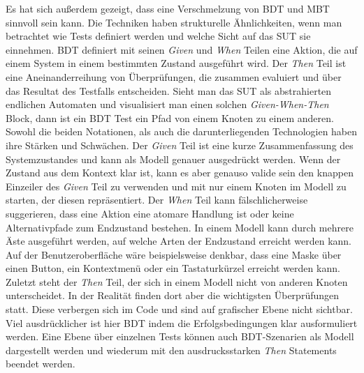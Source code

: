 Es hat sich außerdem gezeigt, dass eine Verschmelzung von \Gls{BDT} und \Gls{MBT} sinnvoll sein kann. Die Techniken haben strukturelle Ähnlichkeiten, wenn man betrachtet wie Tests definiert werden und welche Sicht auf das \Gls{SUT} sie einnehmen. \Gls{BDT} definiert mit seinen \textit{Given} und \textit{When} Teilen eine Aktion, die auf einem System in einem bestimmten Zustand ausgeführt wird. Der \textit{Then} Teil ist eine Aneinanderreihung von Überprüfungen, die zusammen evaluiert und über das Resultat des Testfalls entscheiden. Sieht man das \Gls{SUT} als abstrahierten endlichen Automaten und visualisiert man einen solchen \textit{Given-When-Then} Block, dann ist ein \Gls{BDT} Test ein Pfad von einem Knoten zu einem anderen. Sowohl die beiden Notationen, als auch die darunterliegenden Technologien haben ihre Stärken und Schwächen. Der \textit{Given} Teil ist eine kurze Zusammenfassung des Systemzustandes und kann als Modell genauer ausgedrückt werden. Wenn der Zustand aus dem Kontext klar ist, kann es aber genauso valide sein den knappen Einzeiler des \textit{Given} Teil zu verwenden und mit nur einem Knoten im Modell zu starten, der diesen repräsentiert. Der \textit{When} Teil kann fälschlicherweise suggerieren, dass eine Aktion eine atomare Handlung ist oder keine Alternativpfade zum Endzustand bestehen. In einem Modell kann durch mehrere Äste ausgeführt werden, auf welche Arten der Endzustand erreicht werden kann. Auf der Benutzeroberfläche wäre beispielsweise denkbar, dass eine Maske über einen Button, ein Kontextmenü oder ein Tastaturkürzel erreicht werden kann. Zuletzt steht der \textit{Then} Teil, der sich in einem Modell nicht von anderen Knoten unterscheidet. In der Realität finden dort aber die wichtigsten Überprüfungen statt. Diese verbergen sich im Code und sind auf grafischer Ebene nicht sichtbar. Viel ausdrücklicher ist hier \Gls{BDT} indem die Erfolgsbedingungen klar ausformuliert werden. Eine Ebene über einzelnen Tests können auch \Gls{BDT}-Szenarien als Modell dargestellt werden und wiederum mit den ausdrucksstarken \textit{Then} Statements beendet werden.\\


